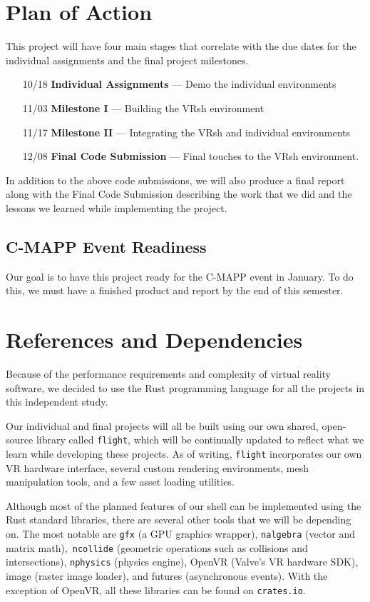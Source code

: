 \documentclass[titlepage,12pt]{article}
\begin{document}
\section{Plan of Action}

This project will have four main stages that correlate with the due dates for
the individual assignments and the final project milestones.

\begin{enumerate}[leftmargin=*]
    \item [10/18] \textbf{Individual Assignments} --- Demo the individual
        environments
    \item [11/03] \textbf{Milestone I} --- Building the VRsh environment
    \item [11/17] \textbf{Milestone II} --- Integrating the VRsh and individual
        environments
    \item [12/08] \textbf{Final Code Submission} --- Final touches to the VRsh
        environment.
\end{enumerate}

In addition to the above code submissions, we will also produce a final report
along with the Final Code Submission describing the work that we did and the
lessons we learned while implementing the project.

\subsection{C-MAPP Event Readiness}
Our goal is to have this project ready for the C-MAPP event in January. To do
this, we must have a finished product and report by the end of this semester.

\section{References and Dependencies}

Because of the performance requirements and complexity of virtual reality
software, we decided to use the Rust programming language for all the projects
in this independent study.

Our individual and final projects will all be built using our own shared,
open-source library called \texttt{flight}, which will be continually updated to
reflect what we learn while developing these projects. As of writing,
\texttt{flight} incorporates our own VR hardware interface, several custom
rendering environments, mesh manipulation tools, and a few asset loading
utilities.

Although most of the planned features of our shell can be implemented using the
Rust standard libraries, there are several other tools that we will be depending
on.  The most notable are \texttt{gfx} (a GPU graphics wrapper),
\texttt{nalgebra} (vector and matrix math),\ \texttt{ncollide} (geometric
operations such as collisions and intersections), \texttt{nphysics} (physics
engine), OpenVR (Valve's VR hardware SDK), image (raster image loader), and
futures (asynchronous events). With the exception of OpenVR, all these libraries
can be found on \texttt{crates.io}.
\end{document}
